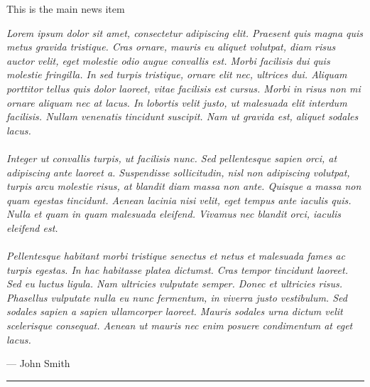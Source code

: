 \documentclass[10pt,a4paper]{article} %
\newcommand{\SepRule}{\noindent %
    \begin{center}
        \rule{250pt}{1pt} %
    \end{center}
}
\newcommand{\NewsItem}[1]{ %
    \usefont{T1}{fvs}{n}{n} %
    \vspace{24pt}\large #1\vspace{3pt} %
    \par \normalsize \normalfont}
\begin{document}
\begin{center}
\begin{minipage}[h]{0.75\linewidth}
        \NewsItem{This is the main news item} %
        \vspace{3pt} %
        \textit{
            Lorem ipsum dolor sit amet, consectetur adipiscing elit. Praesent quis magna
            quis metus gravida tristique. Cras ornare, mauris eu aliquet volutpat, diam
            risus auctor velit, eget molestie odio augue convallis est. Morbi facilisis dui
            quis molestie fringilla. In sed turpis tristique, ornare elit nec, ultrices
            dui. Aliquam porttitor tellus quis dolor laoreet, vitae facilisis est cursus.
            Morbi in risus non mi ornare aliquam nec at lacus. In lobortis velit justo, ut
            malesuada elit interdum facilisis. Nullam venenatis tincidunt suscipit. Nam ut
            gravida est, aliquet sodales lacus.\\ \\
            Integer ut convallis turpis, ut facilisis nunc. Sed pellentesque sapien orci,
            at adipiscing ante laoreet a. Suspendisse sollicitudin, nisl non adipiscing
            volutpat, turpis arcu molestie risus, at blandit diam massa non ante. Quisque a
            massa non quam egestas tincidunt. Aenean lacinia nisi velit, eget tempus ante
            iaculis quis. Nulla et quam in quam malesuada eleifend. Vivamus nec blandit
            orci, iaculis eleifend est.\\ \\
            Pellentesque habitant morbi tristique senectus et netus et malesuada fames ac
            turpis egestas. In hac habitasse platea dictumst. Cras tempor tincidunt
            laoreet. Sed eu luctus ligula. Nam ultricies vulputate semper. Donec et
            ultricies risus. Phasellus vulputate nulla eu nunc fermentum, in viverra justo
            vestibulum. Sed sodales sapien a sapien ullamcorper laoreet. Mauris sodales
            urna dictum velit scelerisque consequat. Aenean ut mauris nec enim posuere
            condimentum at eget lacus.
        }
        \par\hfill --- John Smith
    \end{minipage}
\end{center}

\vspace{0.5cm}
\SepRule %
\vspace{0.5cm}
\end{document}
